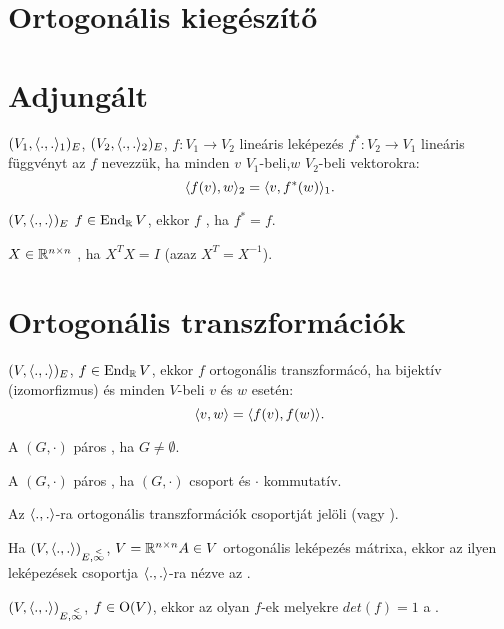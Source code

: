 \section{Ortogonális kiegészítő}

\section{Adjungált}
\begin{ff}
	$(V_1,\langle.,.\rangle_1)_E$, $(V_2,\langle.,.\rangle_2)_E$, $f:V_1\to V_2$ lineáris leképezés
	$f^*:V_2\to V_1$ lineáris függvényt az $f$  nevezzük, ha
	minden $v$ $V_1$-beli,$w$ $V_2$-beli vektorokra:
	\begin{equation*}
		\langle f(v),w\rangle_2=\langle v,f^*(w)\rangle_1.
	\end{equation*}
\end{ff}
\begin{ff}
	$(V,\langle.,.\rangle)_E$ $f\in\operatorname{End}_{\mathbb{R}} V$, ekkor $f$ , ha $f^*=f$.
\end{ff}
\begin{ff}
	$X\in\mathbb{R}^{n\times n}$ , ha $X^TX=I$ (azaz $X^T=X^{-1}$).
\end{ff}

\section{Ortogonális transzformációk}
\begin{ff}
	$(V,\langle.,.\rangle)_E$, $f\in\operatorname{End}_{\mathbb{R}} V$, ekkor $f$ ortogonális transzformácó, ha bijektív
	(izomorfizmus) és minden $V$-beli $v$ és $w$ esetén:
	\begin{equation*}
		\langle v,w\rangle=\langle f(v),f(w)\rangle.
	\end{equation*}
\end{ff}
\begin{ff}
	A $(G,\cdot)$ páros , ha $G\neq\emptyset$.
\end{ff}
\begin{ff}
	A $(G,\cdot)$ páros , ha $(G,\cdot)$ csoport és $\cdot$ 
	kommutatív.
\end{ff}
\begin{jel}
	Az $\langle.,.\rangle$-ra ortogonális transzformációk csoportját
	 jelöli (vagy \vjel{$\vO_{\scp{}}$}).
\end{jel}
\begin{ff}
	Ha $(V,\langle.,.\rangle)_{E,\overset{<}{\infty}}$, $V=\mathbb{R}^{n\times n} A\in V$ ortogonális leképezés mátrixa, ekkor az
	ilyen leképezések csoportja $\langle.,.\rangle$-ra nézve az .
\end{ff}
\begin{jel}
\end{jel}
\begin{ff}
	$(V,\langle.,.\rangle)_{E,\overset{<}{\infty}}$, $f\in\operatorname{O}(V)$, ekkor az olyan $f$-ek melyekre $det(f)=1$ a
	.
\end{ff}
\begin{jel}
\end{jel}

